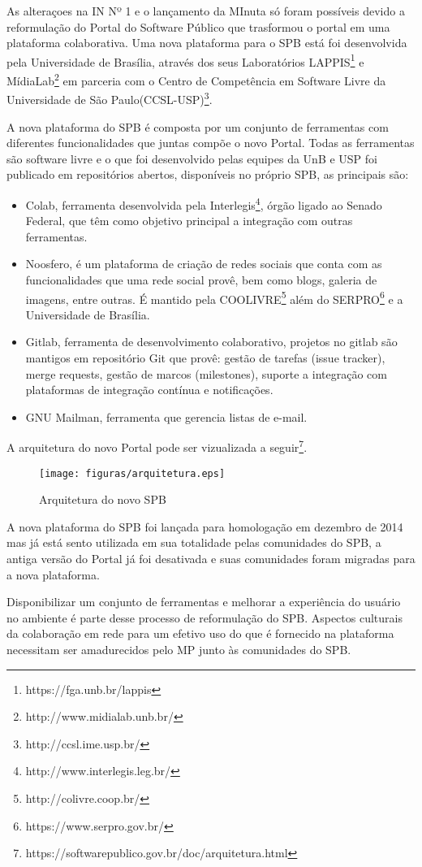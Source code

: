 As alteraçoes na IN Nº 1 e o lançamento da MInuta só foram possíveis devido 
a reformulação do Portal do Software Público que trasformou o portal em uma 
plataforma colaborativa. Uma nova plataforma para o SPB está foi desenvolvida
pela Universidade de Brasília, através dos seus Laboratórios LAPPIS\footnote{https://fga.unb.br/lappis} 
e MídiaLab\footnote{http://www.midialab.unb.br/} 
em parceria com o Centro de Competência em Software Livre da Universidade de São Paulo(CCSL-USP)\footnote{http://ccsl.ime.usp.br/}.

A nova plataforma do SPB é composta por um conjunto de ferramentas com diferentes funcionalidades
que juntas compõe o novo Portal. Todas as ferramentas são software livre e o que foi desenvolvido pelas equipes da UnB e 
USP foi publicado em repositórios abertos, disponíveis no próprio SPB, as principais são:
\begin{itemize}

\item Colab, ferramenta desenvolvida pela Interlegis\footnote{http://www.interlegis.leg.br/}, órgão ligado 
ao Senado Federal, que têm como objetivo principal a integração com outras ferramentas.

\item Noosfero, é um plataforma de criação de redes sociais que conta com as funcionalidades
que uma rede social provê, bem como blogs, galeria de imagens, entre outras. É mantido pela 
COOLIVRE\footnote{http://colivre.coop.br/} além do SERPRO\footnote{https://www.serpro.gov.br/} e a 
Universidade de Brasília.

\item Gitlab, ferramenta de desenvolvimento colaborativo, projetos no gitlab são mantigos em 
repositório Git que provê: gestão de tarefas (issue tracker), merge requests, 
gestão de marcos (milestones), suporte a integração com plataformas de integração contínua e notificações.

\item GNU Mailman, ferramenta que gerencia listas de e-mail.

\end{itemize}

A arquitetura do novo Portal pode ser vizualizada a seguir\footnote{https://softwarepublico.gov.br/doc/arquitetura.html}.

\begin{figure}[h]
	\centering
	\label{arquitetura}
		\texttt{[image: figuras/arquitetura.eps]}
	\caption{Arquitetura do novo SPB}
\end{figure}


A nova plataforma do SPB foi lançada para homologação em dezembro de 2014 mas já
está sento utilizada em sua totalidade pelas comunidades do SPB, a antiga versão do Portal 
já foi desativada e suas comunidades foram migradas para a nova plataforma. 

Disponibilizar um conjunto de ferramentas e melhorar a experiência do usuário no 
ambiente é parte desse processo de reformulação do SPB. Aspectos culturais 
da colaboração em rede para um efetivo uso do que é fornecido na plataforma 
necessitam ser amadurecidos pelo MP junto às comunidades do SPB.

